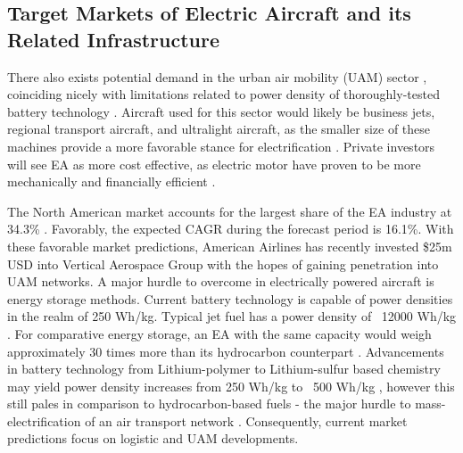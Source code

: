 \documentclass[../main.tex]{subfiles}
\begin{document}
\subsection{Target Markets of Electric Aircraft and its Related Infrastructure}
There also exists potential demand in the urban air mobility (UAM) sector \cite{ref26}, coinciding nicely with limitations related to power density of thoroughly-tested battery technology \cite{ref25}. Aircraft used for this sector would likely be business jets, regional transport aircraft, and ultralight aircraft, as the smaller size of these machines provide a more favorable stance for electrification \cite{ref27}. Private investors will see EA as more cost effective, as electric motor have proven to be more mechanically and financially efficient \cite{ref27}.\par
The North American market accounts for the largest share of the EA industry at 34.3\% \cite{ref26}. Favorably, the expected CAGR during the forecast period is 16.1\%. With these favorable market predictions, American Airlines has recently invested \$25m USD into Vertical Aerospace Group with the hopes of gaining penetration into UAM networks.  A major hurdle to overcome in electrically powered aircraft is energy storage methods. Current battery technology is capable of power densities in the realm of 250  Wh/kg. Typical jet fuel has a power density of ~12000 Wh/kg \cite{ref25}. For comparative energy storage, an EA with the same capacity would weigh approximately 30 times more than its hydrocarbon counterpart \cite{ref26}.  Advancements in battery technology from Lithium-polymer to Lithium-sulfur based chemistry may yield power density increases from 250 Wh/kg to ~500 Wh/kg , however this still pales in comparison to hydrocarbon-based fuels - the major hurdle to mass-electrification of an air transport network \cite{ref26}. Consequently, current market predictions focus on logistic and UAM developments.\par
\end{document}
